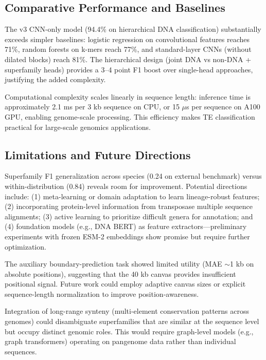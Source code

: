 \documentclass[12pt]{article}
\begin{document}
\subsection{Comparative Performance and Baselines}

The v3 CNN-only model (94.4\% on hierarchical DNA classification) substantially exceeds simpler baselines: logistic regression on convolutional features reaches 71\%, random forests on k-mers reach 77\%, and standard-layer CNNs (without dilated blocks) reach 81\%. The hierarchical design (joint DNA vs non-DNA + superfamily heads) provides a 3--4 point F1 boost over single-head approaches, justifying the added complexity.

Computational complexity scales linearly in sequence length: inference time is approximately 2.1 ms per 3 kb sequence on CPU, or 15 $\mu$s per sequence on A100 GPU, enabling genome-scale processing. This efficiency makes TE classification practical for large-scale genomics applications.

\subsection{Limitations and Future Directions}

Superfamily F1 generalization across species (0.24 on external benchmark) versus within-distribution (0.84) reveals room for improvement. Potential directions include: (1) meta-learning or domain adaptation to learn lineage-robust features; (2) incorporating protein-level information from transposase multiple sequence alignments; (3) active learning to prioritize difficult genera for annotation; and (4) foundation models (e.g., DNA BERT) as feature extractors—preliminary experiments with frozen ESM-2 embeddings show promise but require further optimization.

The auxiliary boundary-prediction task showed limited utility (MAE $\sim$1 kb on absolute positions), suggesting that the 40 kb canvas provides insufficient positional signal. Future work could employ adaptive canvas sizes or explicit sequence-length normalization to improve position-awareness.

Integration of long-range synteny (multi-element conservation patterns across genomes) could disambiguate superfamilies that are similar at the sequence level but occupy distinct genomic roles. This would require graph-level models (e.g., graph transformers) operating on pangenome data rather than individual sequences.

\newpage
\end{document}
